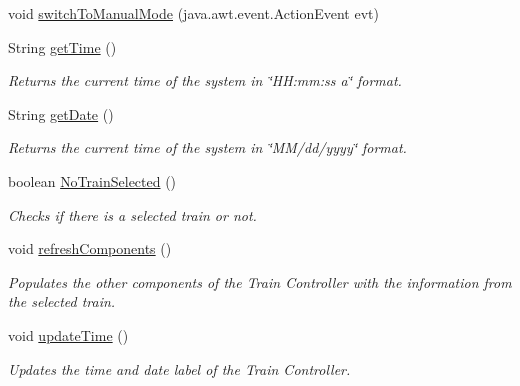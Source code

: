 \begin{DoxyCompactItemize}
\item 
void \hyperlink{classTrainControllerComps_1_1TrainController_a48dfa3386bc22a0ad919ed3911fc85c7}{switch\+To\+Manual\+Mode} (java.\+awt.\+event.\+Action\+Event evt)
\item 
String \hyperlink{classTrainControllerComps_1_1TrainController_a3f90a62fe4293ebe0f23e7b2e0d5eb69}{get\+Time} ()
\begin{DoxyCompactList}\small\item\em Returns the current time of the system in \char`\"{}\+H\+H\+:mm\+:ss a\char`\"{} format. \end{DoxyCompactList}\item 
String \hyperlink{classTrainControllerComps_1_1TrainController_a271b08d280e582a223b242674bca995f}{get\+Date} ()
\begin{DoxyCompactList}\small\item\em Returns the current time of the system in \char`\"{}\+M\+M/dd/yyyy\char`\"{} format. \end{DoxyCompactList}\item 
boolean \hyperlink{classTrainControllerComps_1_1TrainController_a9d02501f35c2c6b12ffcc30fb4ad16e7}{No\+Train\+Selected} ()
\begin{DoxyCompactList}\small\item\em Checks if there is a selected train or not. \end{DoxyCompactList}\item 
void \hyperlink{classTrainControllerComps_1_1TrainController_a11a6391123f16da8974dcb65acfaf6c0}{refresh\+Components} ()
\begin{DoxyCompactList}\small\item\em Populates the other components of the Train Controller with the information from the selected train. \end{DoxyCompactList}\item 
void \hyperlink{classTrainControllerComps_1_1TrainController_a753f8f5e9ded45498bdf4188544ff8f9}{update\+Time} ()
\begin{DoxyCompactList}\small\item\em Updates the time and date label of the Train Controller. \end{DoxyCompactList}\end{DoxyCompactItemize}
